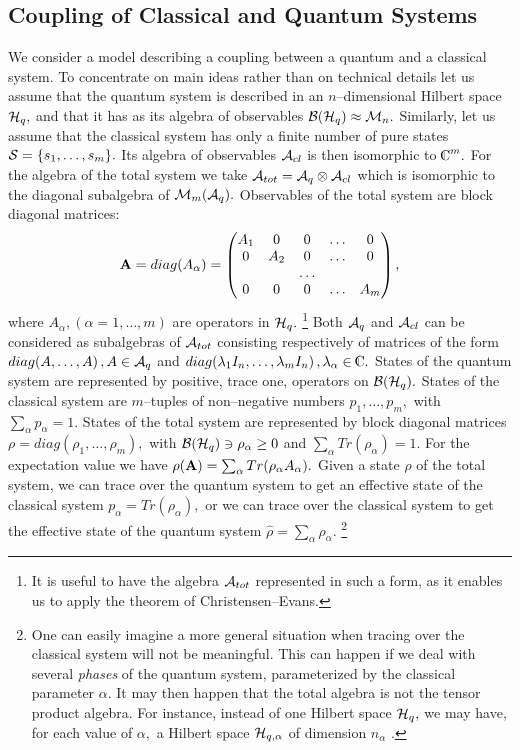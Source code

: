 \documentclass[12pt]{article}
\def\complex{{\kern .1em {\raise .47ex \hbox
{$\scriptscriptstyle
|$}}
\kern -.4em {\rm C}}}
\begin{document}
\subsection{Coupling of Classical and Quantum Systems}
We consider a model describing a coupling between a quantum and
a classical system.  To concentrate on main ideas rather than on
technical details let us assume that the quantum system is described in
an $n$--dimensional Hilbert space ${\cal H}_q , $ and that it has as its
algebra of observables ${\cal B} ({\cal H}_q) \approx {\cal M}_n . $ Similarly, 
let us assume that the classical system has only a finite number of pure
states ${\cal S}=\{ s_1, \ldots , s_m\} . $ Its algebra of observables
${\cal A}_{cl}$ is then isomorphic to $\complex^m . $ For the algebra
of the total system we take
${\cal A}_{tot}={\cal A}_q \otimes {\cal A}_{cl}$ which is isomorphic to the
diagonal subalgebra of ${\cal M}_m  ({\cal A}_q) . $ Observables of the total
system are block diagonal matrices: 
$${\bf A}=diag (A_{\alpha}) = \begin{pmatrix}
A_1&0&0&\ldots&0\cr
0&A_2&0&\ldots&0\cr
&&\ldots&&\cr
0&0&0&\ldots&A_m\cr\end{pmatrix}, $$
where $A_{\alpha},   (\alpha=1, \ldots , m)$ are operators in ${\cal H}_q
. $%
\footnote{It is useful to have the algebra  ${\cal A}_{tot}$
represented in such a form, as it enables us to apply the
theorem of Christensen--Evans.}
Both ${\cal A}_q$ and ${\cal A}_{cl}$ can be considered as
subalgebras  of ${\cal A}_{tot}$ consisting respectively of matrices
of the form
$diag (A, \ldots, A)\,  ,  A\in {\cal A}_q$ and $diag (\lambda_1
I_n, \ldots, \lambda_m I_n)\,  ,  \lambda_{\alpha}\in\complex . $ 
States of the quantum system are represented by positive,  trace one,  
operators on
${\cal B} ({\cal H}_q) . $ States of the classical system are
$m$--tuples of non--negative numbers $p_1, \ldots, p_m , $  with
$\sum_{\alpha} p_{\alpha}=1. $ States of the total system are
represented by block diagonal matrices
$ \rho =diag (\rho_1, \ldots, \rho_m) , $ with ${\cal B} ({\cal
H}_q)\ni \rho_{\alpha}\geq 0$ and $\sum_{\alpha} Tr (\rho_{\alpha})=1
. $ For the expectation value we have  $\rho  ({\bf A}) =\sum_{\alpha}
Tr (\rho_\alpha A_\alpha ) . $ Given a state $\rho$ of the total
system,  we can trace over the quantum system to get an effective state
of the classical system
$p_\alpha =Tr (\rho_\alpha ) ,  $ or we can trace over the classical
system to get the effective state of the quantum system
${\hat\rho}=\sum_\alpha\rho_\alpha . $%
\footnote{One can easily imagine a more general situation when
tracing over the classical system will not be meaningful.  This can
happen if we deal with several {\sl phases} of the quantum system, 
parameterized by the classical parameter $\alpha$.  It may then happen
that the total algebra is not the  tensor product algebra.  For
instance,  instead of one Hilbert space ${\cal H}_q , $ we may have, 
for each value of $\alpha , $ a Hilbert space ${\cal H}_{q, \alpha}$ 
of dimension $n_\alpha$ . }
\end{document}
